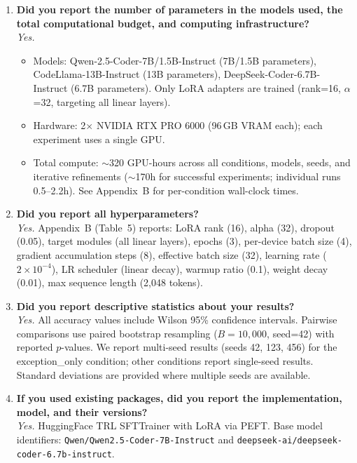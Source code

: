 \documentclass[11pt,a4paper]{article}
\begin{document}
\begin{enumerate}
\item \textbf{Did you report the number of parameters in the models used, the total computational budget, and computing infrastructure?} \\
\textit{Yes.}
\begin{itemize}
\item Models: Qwen-2.5-Coder-7B/1.5B-Instruct (7B/1.5B parameters), CodeLlama-13B-Instruct (13B parameters), DeepSeek-Coder-6.7B-Instruct (6.7B parameters). Only LoRA adapters are trained (rank=16, $\alpha$=32, targeting all linear layers).
\item Hardware: 2$\times$ NVIDIA RTX PRO 6000 (96\,GB VRAM each); each experiment uses a single GPU.
\item Total compute: ${\sim}$320 GPU-hours across all conditions, models, seeds, and iterative refinements (${\sim}$170h for successful experiments; individual runs 0.5--2.2h). See Appendix~B for per-condition wall-clock times.
\end{itemize}

\item \textbf{Did you report all hyperparameters?} \\
\textit{Yes.} Appendix~B (Table~5) reports: LoRA rank (16), alpha (32), dropout (0.05), target modules (all linear layers), epochs (3), per-device batch size (4), gradient accumulation steps (8), effective batch size (32), learning rate ($2 \times 10^{-4}$), LR scheduler (linear decay), warmup ratio (0.1), weight decay (0.01), max sequence length (2,048 tokens).

\item \textbf{Did you report descriptive statistics about your results?} \\
\textit{Yes.} All accuracy values include Wilson 95\% confidence intervals. Pairwise comparisons use paired bootstrap resampling ($B{=}10{,}000$, seed=42) with reported $p$-values. We report multi-seed results (seeds 42, 123, 456) for the exception\_only condition; other conditions report single-seed results. Standard deviations are provided where multiple seeds are available.

\item \textbf{If you used existing packages, did you report the implementation, model, and their versions?} \\
\textit{Yes.} HuggingFace TRL SFTTrainer with LoRA via PEFT. Base model identifiers: \texttt{Qwen/Qwen2.5-Coder-7B-Instruct} and \texttt{deepseek-ai/deepseek-coder-6.7b-instruct}.
\end{enumerate}
\end{document}
